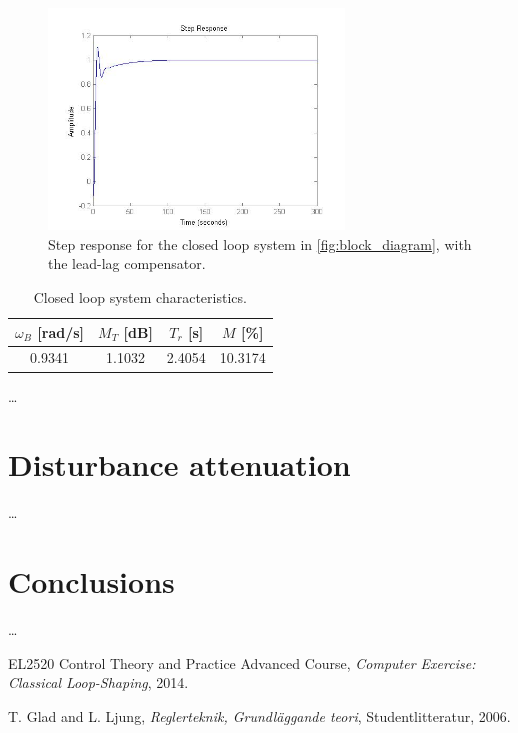 \documentclass[a4paper]{article}
\begin{document}
\begin{figure}[h!]
	\begin{center}
		\includegraphics[width=0.7\textwidth]{Step_Gc_2}
	\end{center}
	\caption{Step response for the closed loop system in \cref{fig:block_diagram}, with the lead-lag compensator.}
	\label{fig:step_response}
\end{figure}

\begin{table}[h!]
\begin{center}
	\begin{tabular}{|c|c|c|c|}
		\hline
		$\omega_B$ [rad/s] & $M_T$ [dB] & $T_r$ [s] & $M$ [\%] \\
		\hline
		0.9341 & 1.1032 & 2.4054 & 10.3174\\
		\hline
	\end{tabular}
\end{center}
\caption{Closed loop system characteristics.}
\label{tb:response}
\end{table}

\ldots

\section{Disturbance attenuation}
\ldots

\section{Conclusions}
\ldots

\begin{thebibliography}{9}

EL2520 Control Theory and Practice Advanced Course, \emph{Computer Exercise: Classical Loop-Shaping}, 2014.

T. Glad and L. Ljung, \emph{Reglerteknik, Grundläggande teori}, Studentlitteratur, 2006.

\end{thebibliography}
\end{document}
